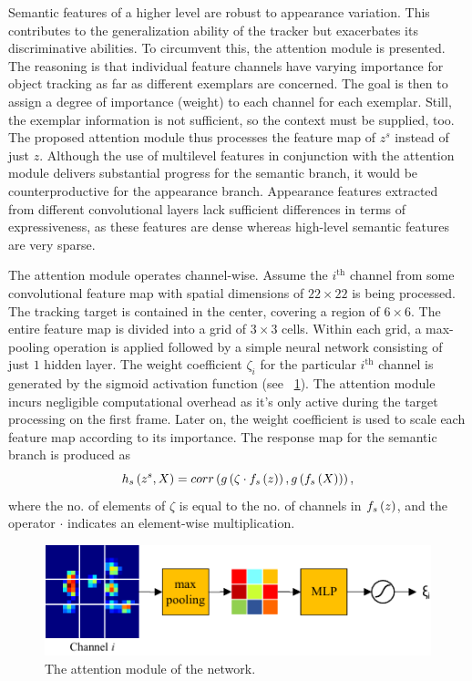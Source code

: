 Semantic features of a higher level are robust to appearance variation. This contributes to the generalization ability of the tracker but exacerbates its discriminative abilities. To circumvent this, the attention module is presented. The reasoning is that individual feature channels have varying importance for object tracking as far as different exemplars are concerned. The goal is then to assign a degree of importance (weight) to each channel for each exemplar. Still, the exemplar information is not sufficient, so the context must be supplied, too. The proposed attention module thus processes the feature map of $z^s$ instead of just $z$. Although the use of multilevel features in conjunction with the attention module delivers substantial progress for the semantic branch, it would be counterproductive for the appearance branch. Appearance features extracted from different convolutional layers lack sufficient differences in terms of expressiveness, as these features are dense whereas high-level semantic features are very sparse.

The attention module operates channel-wise. Assume the $i^{\text{th}}$ channel from some convolutional feature map with spatial dimensions of $22 \times 22$ is being processed. The tracking target is contained in the center, covering a region of $6 \times 6$. The entire feature map is divided into a grid of $3 \times 3$ cells. Within each grid, a max-pooling operation is applied followed by a simple neural network consisting of just $1$ hidden layer. The weight coefficient $\zeta_i$ for the particular $i^{\text{th}}$ channel is generated by the sigmoid activation function (see \figstr{}~\ref{fig:TwofoldSiameseNetAttentionModule}). The attention module incurs negligible computational overhead as it's only active during the target processing on the first frame. Later on, the weight coefficient is used to scale each feature map according to its importance. The response map for the semantic branch is produced as
\begin{equation}
    {h_s} \left( z^s, X \right) =
    {corr} \left( 
        {g} \left( \zeta \cdot {f_s} \left( z \right) \right),
        {g} \left( {f_s} \left( X \right) \right)
     \right),
\end{equation}
where the no. of elements of $\zeta$ is equal to the no. of channels in ${f_s} \left( z \right)$, and the operator $\cdot$ indicates an element-wise multiplication.

\begin{figure}[t]
    \centerline{\includegraphics[width=0.6\linewidth]{figures/theoretical_foundations/twofold_siamese_net_attention_module.pdf}}
    \caption[\snet{} attention module]{The attention module of the \snet{} network. }
    \label{fig:TwofoldSiameseNetAttentionModule}
\end{figure}

